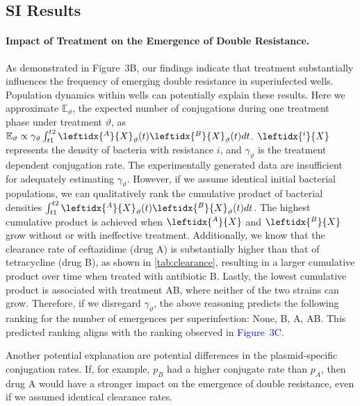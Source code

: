 \subsection{SI Results\label{ssec:si_results}}
\paragraph{Impact of Treatment on the Emergence of Double Resistance.}
As demonstrated in Figure~3B, our findings indicate that treatment substantially influences the frequency of emerging double resistance in superinfected wells.
Population dynamics within wells can potentially explain these results.
Here we approximate  $\mathbb{E}_\vartheta$, the expected number of conjugations during one treatment phase under treatment $\vartheta$, as
$\mathbb{E}_\vartheta \propto \gamma_\vartheta \int_{t1}^{t2} \leftidx{^A}{X}_\vartheta(t) \leftidx{^B}{X}_\vartheta(t) dt$.
$\leftidx{^i}{X}$ represents the density of bacteria with resistance $i$, and $\gamma_\vartheta$ is the treatment dependent conjugation rate.
The experimentally generated data are insufficient for adequately estimating $\gamma_\vartheta$.
However, if we assume identical initial bacterial populations, we can qualitatively rank the cumulative product of bacterial densities $\int_{t1}^{t2} \leftidx{^A}{X}_\vartheta(t) \leftidx{^B}{X}_\vartheta(t) dt$.
The highest cumulative product is achieved when $\leftidx{^A}{X}$ and $\leftidx{^B}{X}$ grow without or with ineffective treatment.
Additionally, we know that the clearance rate of ceftazidime (drug A) is substantially higher than that of tetracycline (drug B), as shown in \autoref{tab:clearance}, resulting in a larger cumulative product over time when treated with antibiotic B.
Lastly, the lowest cumulative product is associated with treatment AB, where neither of the two strains can grow.
Therefore, if we disregard $\gamma_\vartheta$, the above reasoning predicts the following ranking for the number of emergences per superinfection: None, B, A, AB.
This predicted ranking aligns with the ranking observed in \textcolor{blue}{Figure~3C}.

Another potential explanation are potential differences in the plasmid-specific conjugation rates.
If, for example, $p_B$ had a higher conjugate rate than  $p_A$, then drug A would have a stronger impact on the emergence of double resistance, even if we assumed identical clearance rates.

